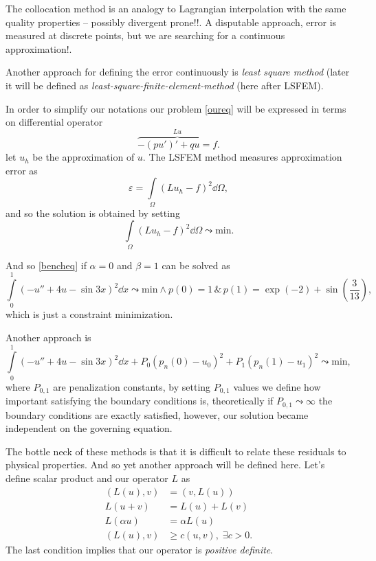 The collocation method is an analogy to Lagrangian interpolation with the same quality properties  -- possibly divergent prone!!. A disputable approach, error is measured at discrete points, but we are searching for a continuous approximation!.


Another approach for defining the error continuously is {\it least square method} (later it will be defined as {\it least-square-finite-element-method} (here after LSFEM).

In order to simplify our notations our problem \eqref{oureq} will be expressed in terms on differential operator
\begin{equation}
 \overbrace{- (p u')' + q u = f}^{Lu}.
\end{equation}
let $u_{h}$ be the approximation of $u$. The LSFEM method measures approximation error as
\begin{equation}
 \varepsilon = \int\limits_{\Omega} (L u_{h} - f )^{2} \dd \Omega,
\end{equation}
and so the solution is obtained by setting
\begin{equation}
  \int\limits_{\Omega} (L u_{h} - f )^{2} \dd \Omega \leadsto \mbox{min}.
\end{equation}

And so \eqref{bencheq} if $\alpha=0$ and $\beta=1$ can be solved as 
\begin{equation}
 \int\limits_{0}^{1} (  -u'' + 4u  - \sin 3x )^{2} \dd x \leadsto \mbox{min} \wedge p(0) = 1 \, \& \, p(1) = \exp(-2) + \sin\left(\frac{3}{13}\right),
\end{equation}
which is just a constraint minimization.

Another approach is 
\begin{equation}
 \int\limits_{0}^{1} (  -u'' + 4u  - \sin 3x )^{2} \dd x  + P_{0} (p_{n}(0)-u_{0})^{2} + P_{1} (p_{n}(1) - u_{1})^{2}\leadsto \mbox{min} ,
 \end{equation}
where $P_{0,1}$ are penalization constants, by setting $P_{0,1}$ values we define how important satisfying the boundary conditions is, theoretically if $P_{0,1} \leadsto \infty$ the boundary conditions are exactly satisfied, however, our solution became independent on the governing equation.

The bottle neck of these methods is that it is difficult to relate these residuals to physical properties. And so yet another approach will be defined here. Let's define scalar product and our operator $L$ as
\begin{equation}
\begin{split}
 (L(u),v) &= (v, L(u)) \\
  L(u + v) &= L(u) + L(v) \\
  L(\alpha u) &= \alpha L(u) \\
  (L(u),v) &\ge c(u,v), \; \exists c>0.
\end{split}
\end{equation}
The last condition implies that our operator is {\it positive definite}.

